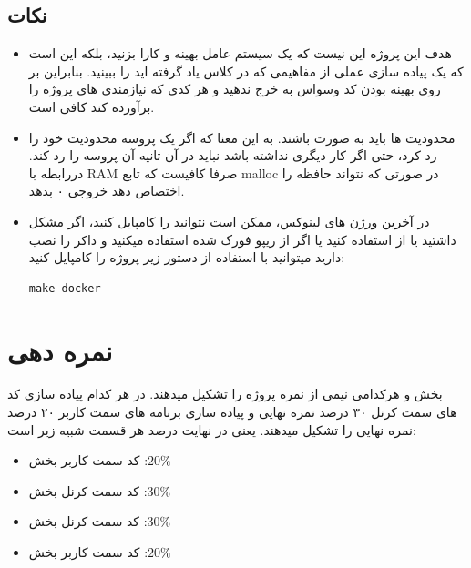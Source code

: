 \documentclass{article}
\begin{document}
		
		\subsection{نکات}
		\begin{itemize}
	
			\item 
			هدف این پروژه این نیست که یک سیستم عامل بهینه و کارا بزنید،  بلکه این است که یک پیاده سازی عملی از مفاهیمی که در کلاس یاد گرفته اید را ببینید. بنابراین بر روی بهینه بودن کد وسواس به خرج ندهید و هر کدی که نیازمندی های پروژه را برآورده کند کافی است.
			\item 
			محدودیت ها باید به صورت 
			باشند. به این معنا که اگر یک پروسه محدودیت خود را رد کرد، حتی اگر  کار دیگری نداشته باشد نباید در آن ثانیه آن پروسه را رد کند. دررابطه با RAM صرفا کافیست که تابع malloc در صورتی که نتواند حافظه را اختصاص دهد خروجی ۰ بدهد.
			
			\item 
			در آخرین ورژن های لینوکس، ممکن است نتوانید  را کامپایل کنید، اگر مشکل داشتید یا از  استفاده کنید یا اگر از ریپو فورک شده استفاده میکنید و داکر را نصب دارید میتوانید با استفاده از دستور زیر پروژه را کامپایل کنید:
			\begin{verbatim}
make docker
			\end{verbatim}
			
		\end{itemize}
		
		\section{نمره دهی}
		 بخش  و  هرکدامی نیمی از نمره پروژه را تشکیل میدهند. در هر کدام پیاده سازی کد های سمت کرنل ۳۰ درصد نمره نهایی و پیاده سازی برنامه های سمت کاربر ۲۰ درصد نمره نهایی را تشکیل میدهند. یعنی در نهایت درصد هر قسمت شبیه زیر است:
		 \begin{itemize}
		 	\item 
		 	کد سمت کاربر بخش 
		 	:$20\%$
		 	\item 
		 	کد سمت کرنل بخش 
		 	:$30\%$
		 	\item 
		 	کد سمت کرنل بخش 
		 	:$30\%$
		 	\item 
		 	کد سمت کاربر بخش 
		 	:$20\%$
		 \end{itemize}
		
	
\end{document}
